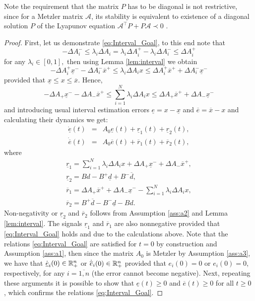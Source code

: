 Note the requirement that the matrix $P$ has to be diagonal is not restrictive, since for a Metzler matrix $\mathcal{A}$, its stability is equivalent to existence of a diagonal solution $P$ of the Lyapunov equation $\mathcal{A}^{\top}P+P\mathcal{A}\prec0$ \cite{FarinaRinaldi2000}.
\begin{proof}
	First, let us demonstrate \eqref{eq:Interval_Goal}, to this end note that
	\[
	-\Delta A_{i}^{-}\leq\lambda_{i}\Delta A_{i}=\lambda_{i}\Delta A_{i}^{+}-\lambda_{i}\Delta A_{i}^{-}\leq\Delta A_{i}^{+}
	\]
	for any $\lambda_{i}\in[0,1],$ then using Lemma \ref{lem:interval} we obtain
	\[
	-\Delta A_{i}^{+}\underline{x}^{-}-\Delta A_{i}^{-}\overline{x}^{+}\leq\lambda_{i}\Delta A_{i}x\leq\Delta A_{i}^{+}\overline{x}^{+}+\Delta A_{i}^{-}\underline{x}^{-}
	\]
	provided that $\underline{x}\leq x\leq\overline{x}$. Hence,
	\[
	-\Delta A_{+}\underline{x}^{-}-\Delta A_{-}\overline{x}^{+}\leq\sum_{i=1}^{N}\lambda_{i}\Delta A_{i}x\leq\Delta A_{+}\overline{x}^{+}+\Delta A_{-}\underline{x}^{-}
	\]
	and introducing usual interval estimation errors $\underline{e}=x-\underline{x}$ and $\overline{e}=\overline{x}-x$ and calculating their dynamics we get:
	\begin{eqnarray*}
		\dot{\underline{e}}(t) & = & A_{0}\underline{e}(t)+\underline{r}_{1}(t)+\underline{r}_{2}(t),\\
		\dot{\overline{e}}(t) & = & A_{0}\overline{e}(t)+\overline{r}_{1}(t)+\overline{r}_{2}(t),
	\end{eqnarray*}
	where
	\begin{gather*}
	\underline{r}_{1}=\sum_{i=1}^{N}\lambda_{i}\Delta A_{i}x+\Delta A_{+}\underline{x}^{-}+\Delta A_{-}\overline{x}^{+},\\
	\underline{r}_{2}=Bd-B^{+}\underline{d}+B^{-}\overline{d},\\
	\overline{r}_{1}=\Delta A_{+}\overline{x}^{+}+\Delta A_{-}\underline{x}^{-}-\sum_{i=1}^{N}\lambda_{i}\Delta A_{i}x,\\
	\overline{r}_{2}=B^{+}\overline{d}-B^{-}\underline{d}-Bd.
	\end{gather*}
	Non-negativity or $\underline{r}_{2}$ and $\overline{r}_{2}$ follows from Assumption \ref{ass:a2} and Lemma \ref{lem:interval}. The signals $\underline{r}_{1}$ and $\overline{r}_{1}$ are also nonnegative provided that \eqref{eq:Interval_Goal} holds and due to the calculations above. Note that the relations \eqref{eq:Interval_Goal} are satisfied for $t=0$ by construction and Assumption \ref{ass:a1}, then since the matrix $A_{0}$ is Metzler by Assumption \ref{ass:a3}, we have that $\dot{\underline{e}}_{i}(0)\in\mathbb{R}_{+}^{n}$ or $\dot{\overline{e}}_{i}(0)\in\mathbb{R}_{+}^{n}$ provided that $e_{i}(0)=0$ or $e_{i}(0)=0$, respectively, for any $i=\overline{1,n}$ (the error cannot become negative). Next, repeating these arguments it is possible to show that $\underline{e}(t)\geq0$ and $\overline{e}(t)\geq0$ for all $t\geq0$ \cite{Smith95}, which confirms the relations \eqref{eq:Interval_Goal}.
	

\end{proof}
